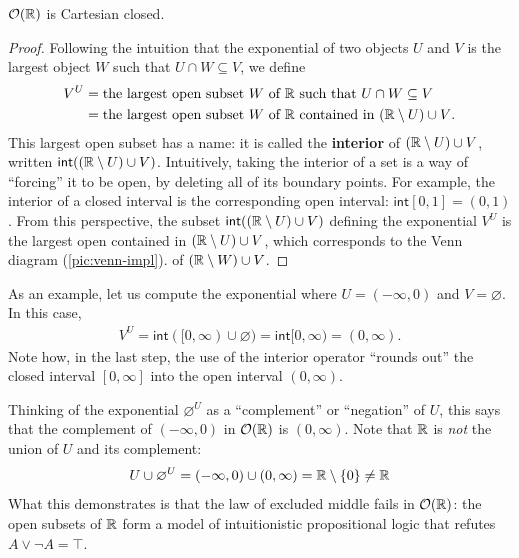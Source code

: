 \begin{proposition}
  \(\mathcal O(\mathbb R)\) is Cartesian closed.
\end{proposition}
\begin{proof}
  Following the intuition that the exponential of two objects \(U\) and \(V\)
  is the largest object \(W\) such that \(U\cap W \subseteq V\),
  we define
  \begin{align}
  V^U &= \text{the largest open subset \(W\) of \(\mathbb R\) such that \(U\cap W\subseteq V\)} \\
      &= \text{the largest open subset \(W\) of \(\mathbb R\) contained in \((\mathbb R\setminus U) \cup V\)}.
  \end{align}
  This largest open subset has a name: it is called the
  \textbf{interior} of \((\mathbb R\setminus U) \cup V\),
  written \(\mathsf{int}((\mathbb R\setminus U) \cup V)\).
  Intuitively, taking the interior of a set is a way of ``forcing'' it to be open,
  by deleting all of its boundary points. For example, the interior of a closed interval is the corresponding
  open interval: \(\mathsf{int}[0,1] = (0,1)\).
  From this perspective, the subset \(\mathsf{int}((\mathbb R\setminus U) \cup V)\) defining the exponential \(V^U\)
  is the largest open contained in \((\mathbb R\setminus U) \cup V\), which corresponds to the Venn diagram (\ref{pic:venn-impl}).
  of \((\mathbb R\setminus W) \cup V\).
\end{proof}
As an example, let us compute the exponential where \(U = (-\infty,0)\) and \(V=\varnothing\).
In this case,
\begin{align}
  V^U = \mathsf{int}([0,\infty) \cup \varnothing)
      = \mathsf{int}[0,\infty)
      = (0,\infty).
\end{align}
Note how, in the last step, the use of the interior operator ``rounds out'' the closed interval \([0,\infty]\)
into the open interval \((0,\infty)\).

Thinking of the exponential \(\varnothing^U\) as a ``complement'' or ``negation'' of \(U\),
this says that the complement of \((-\infty,0)\) in \(\mathcal O(\mathbb R)\) is \((0,\infty)\).
Note that \(\mathbb R\) is \emph{not} the union of \(U\) and its complement:
\[
U \cup \varnothing^U
=
(-\infty,0) \cup (0,\infty)
=
\mathbb R\setminus\{0\}
\ne \mathbb R
\]
What this demonstrates is that the law of excluded middle fails in \(\mathcal O(\mathbb R)\):
the open subsets of \(\mathbb R\) form a model of intuitionistic propositional logic
that refutes \(A \lor \neg A = \top\).

